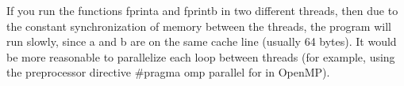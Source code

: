 {	\begin{figure}[H]
		
	\end{figure}
	\par If you run the functions fprint\textunderscore a and fprint\textunderscore b in two different threads, then due to the constant synchronization of memory between the threads, the program will run slowly, since a and b are on the same cache line (usually 64 bytes). It would be more reasonable to parallelize each loop between threads (for example, using the preprocessor directive  \#pragma omp parallel for in OpenMP).
}